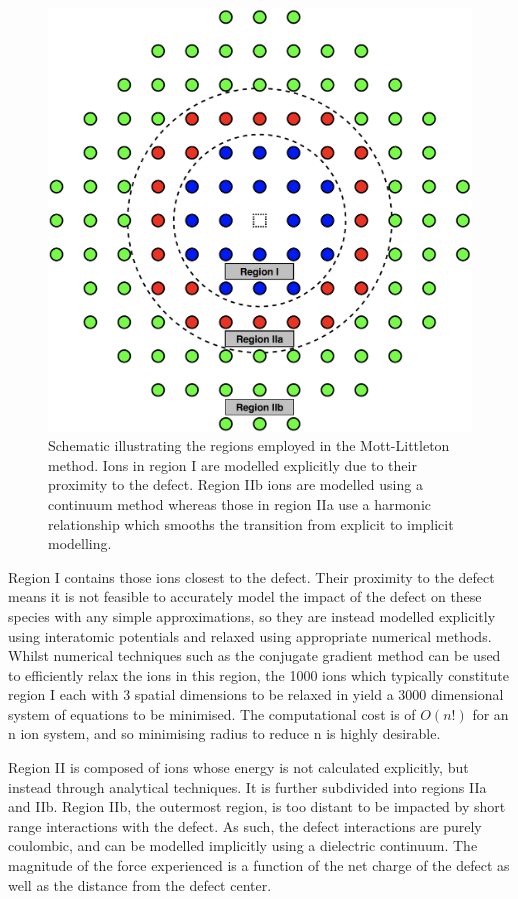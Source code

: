 \begin{figure}
  \centering
  \includegraphics[width = 0.9\linewidth]{figures/Mott-Littleton}
  \caption[Schematic illustrating the regions employed in the Mott-Littleton method.]{Schematic illustrating the regions employed in the Mott-Littleton method. Ions in region I are modelled explicitly due to their proximity to the defect. Region IIb ions are modelled using a continuum method whereas those in region IIa use a harmonic relationship which smooths the transition from explicit to implicit modelling.}
  \label{fig:mott}
\end{figure}

Region I contains those ions closest to the defect.
Their proximity to the defect means it is not feasible to accurately model the impact of the defect on these species with any simple approximations, so they are instead modelled explicitly using interatomic potentials and relaxed using appropriate numerical methods.
Whilst numerical techniques such as the conjugate gradient method can be used to efficiently relax the ions in this region, the 1000 ions which typically constitute region I each with 3 spatial dimensions to be relaxed in yield a 3000 dimensional system of equations to be minimised.
The computational cost is of $O(n!)$ for an n ion system, and so minimising radius to reduce n is highly desirable.

Region II is composed of ions whose energy is not calculated explicitly, but instead through analytical techniques.
It is further subdivided into regions IIa and IIb.
Region IIb, the outermost region, is too distant to be impacted by short range interactions with the defect.
As such, the defect interactions are purely coulombic, and can be modelled implicitly using a dielectric continuum.
The magnitude of the force experienced is a function of the net charge of the defect as well as the distance from the defect center.


